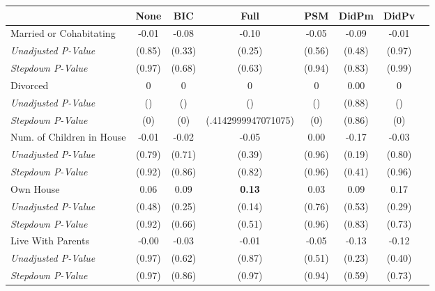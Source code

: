 \begin{tabular}{l c c c c c c c}
\toprule
 & None & BIC & Full & PSM & DidPm & DidPv \\
\midrule
Married or Cohabitating & -0.01 & -0.08 & -0.10 & -0.05 & -0.09 & -0.01 \\
\quad \textit{Unadjusted P-Value} & (0.85) & (0.33) & (0.25) & (0.56) & (0.48) & (0.97) \\
\quad \textit{Stepdown P-Value} & (0.97) & (0.68) & (0.63) & (0.94) & (0.83) & (0.99) \\
Divorced & 0 & 0 & 0 & 0 & 0.00 & 0 \\
\quad \textit{Unadjusted P-Value} & () & () & () & () & (0.88) & () \\
\quad \textit{Stepdown P-Value} & (0) & (0) & (.4142999947071075) & (0) & (0.86) & (0) \\
Num. of Children in House & -0.01 & -0.02 & -0.05 & 0.00 & -0.17 & -0.03 \\
\quad \textit{Unadjusted P-Value} & (0.79) & (0.71) & (0.39) & (0.96) & (0.19) & (0.80) \\
\quad \textit{Stepdown P-Value} & (0.92) & (0.86) & (0.82) & (0.96) & (0.41) & (0.96) \\
Own House & 0.06 & 0.09 & \textbf{ 0.13 } & 0.03 & 0.09 & 0.17 \\
\quad \textit{Unadjusted P-Value} & (0.48) & (0.25) & (0.14) & (0.76) & (0.53) & (0.29) \\
\quad \textit{Stepdown P-Value} & (0.92) & (0.66) & (0.51) & (0.96) & (0.83) & (0.73) \\
Live With Parents & -0.00 & -0.03 & -0.01 & -0.05 & -0.13 & -0.12 \\
\quad \textit{Unadjusted P-Value} & (0.97) & (0.62) & (0.87) & (0.51) & (0.23) & (0.40) \\
\quad \textit{Stepdown P-Value} & (0.97) & (0.86) & (0.97) & (0.94) & (0.59) & (0.73) \\
\bottomrule
\end{tabular}
